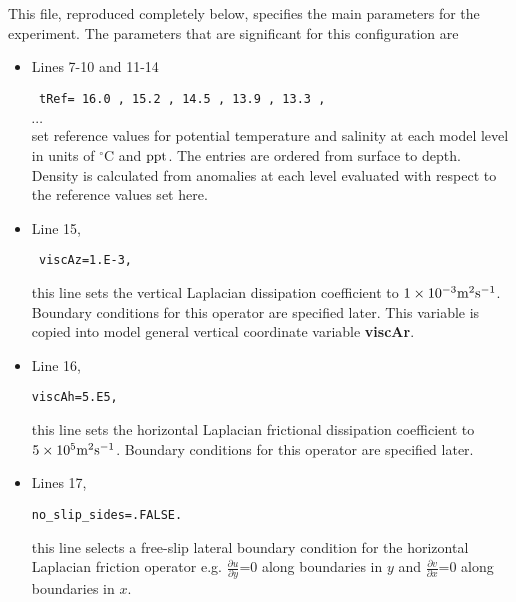 This file, reproduced completely below, specifies the main parameters 
for the experiment. The parameters that are significant for this configuration
are

\begin{itemize}

\item Lines 7-10 and 11-14 
\begin{verbatim} tRef= 16.0 , 15.2 , 14.5 , 13.9 , 13.3 ,  \end{verbatim} 
$\cdots$ \\
set reference values for potential
temperature and salinity at each model level in units of $^{\circ}$C and
${\rm ppt}$. The entries are ordered from surface to depth.
Density is calculated from anomalies at each level evaluated
with respect to the reference values set here.\\


\item Line 15, 
\begin{verbatim} viscAz=1.E-3, \end{verbatim}
this line sets the vertical Laplacian dissipation coefficient to
$1 \times 10^{-3} {\rm m^{2}s^{-1}}$. Boundary conditions
for this operator are specified later. This variable is copied into
model general vertical coordinate variable {\bf viscAr}.


\item Line 16, 
\begin{verbatim}
viscAh=5.E5,
\end{verbatim} 
this line sets the horizontal Laplacian frictional dissipation coefficient to
$5 \times 10^{5} {\rm m^{2}s^{-1}}$. Boundary conditions
for this operator are specified later.

\item Lines 17,
\begin{verbatim}
no_slip_sides=.FALSE.
\end{verbatim}
this line selects a free-slip lateral boundary condition for
the horizontal Laplacian friction operator 
e.g. $\frac{\partial u}{\partial y}$=0 along boundaries in $y$ and
$\frac{\partial v}{\partial x}$=0 along boundaries in $x$.


\end{itemize}
